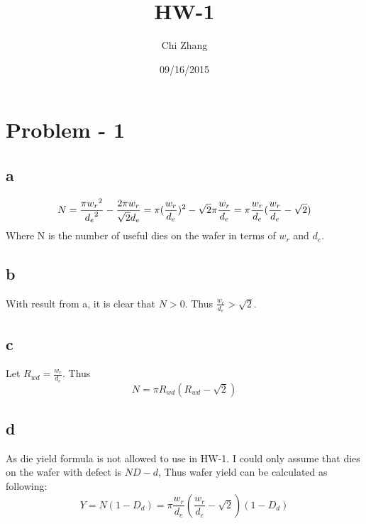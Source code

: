 \documentclass[a4paper,10pt]{article}
\title{HW-1}
\author{Chi Zhang}
\date{09/16/2015}
\begin{document}
\maketitle
\section*{Problem - 1}
\subsection*{a}
\begin{equation}
N = \frac{\pi {w_r}^2}{{d_e}^2} - \frac{2\pi {w_r}}{\sqrt{2} d_e} = \pi(\frac{w_r}{d_e})^2 - \sqrt{2}\pi\frac{w_r}{d_e}\\
= \pi\frac{w_r}{d_e} (\frac{w_r}{d_e} - \sqrt{2})
\end{equation}
Where N is the number of useful dies on the wafer in terms of \begin{math}w_r\end{math} and \begin{math}d_e\end{math}.
\subsection*{b}
With result from a, it is clear that \begin{math}N > 0\end{math}. Thus \begin{math}\frac{w_r}{d_e} > \sqrt{2}\end{math}.
\subsection*{c}
Let \begin{math}R_{wd} = \frac{w_r}{d_e}\end{math}. Thus
\begin{equation}
N = \pi R_{wd} (R_{wd} - \sqrt{2})
\end{equation}
\subsection*{d}
As die yield formula is not allowed to use in HW-1. I could only assume that dies on the wafer with defect is
\begin{math}ND-d\end{math}, Thus wafer yield can be calculated as following:
\begin{equation}
Y = N(1 - D_d) = \pi\frac{w_r}{d_e} (\frac{w_r}{d_e} - \sqrt{2})(1 - D_d)
\end{equation}
\end{document}
